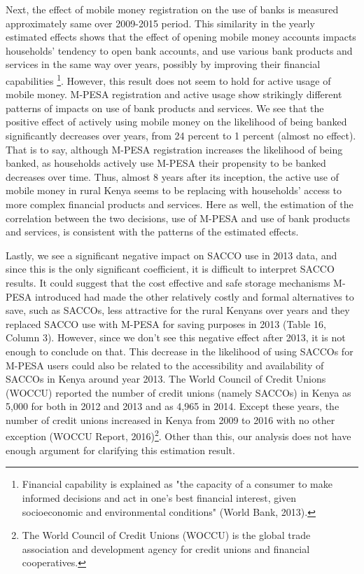 \documentclass[11pt]{article}
\numberwithin{equation}{section}
\begin{document}
Next, the effect of mobile money registration on the use of banks is measured approximately same over 2009-2015 period. This similarity in the yearly estimated effects shows that the effect of opening mobile money accounts impacts households' tendency to open bank accounts, and use various bank products and services in the same way over years, possibly by improving their financial capabilities \footnote{Financial capability is explained as "the capacity of a consumer to make informed decisions and act in one's best financial interest, given socioeconomic and environmental conditions" (World Bank, 2013).}. However, this result does not seem to hold for active usage of mobile money. M-PESA registration and active usage show strikingly different patterns of impacts on use of bank products and services. We see that the positive effect of actively using mobile money on the likelihood of being banked significantly decreases over years, from 24 percent to 1 percent (almost no effect). That is to say, although M-PESA registration increases the likelihood of being banked, as households actively use M-PESA their propensity to be banked decreases over time. Thus, almost 8 years after its inception, the active use of mobile money in rural Kenya seems to be replacing with households' access to more complex financial products and services. Here as well, the estimation of the correlation between the two decisions, use of M-PESA and use of bank products and services, is consistent with the patterns of the estimated effects.

Lastly, we see a significant negative impact on SACCO use in 2013 data, and since this is the only significant coefficient, it is difficult to interpret SACCO results. It  could suggest that the cost effective and safe storage mechanisms M-PESA introduced had made the other relatively costly and formal alternatives to save, such as SACCOs, less attractive for the rural Kenyans over years and they replaced SACCO use with M-PESA for saving purposes in 2013 (Table 16, Column 3). However, since we don't see this negative effect after 2013, it is not enough to conclude on that. This decrease in the likelihood of using SACCOs for M-PESA users could also be related to the accessibility and availability of SACCOs in Kenya around year 2013. The World Council of Credit Unions (WOCCU) reported the number of credit unions (namely SACCOs) in Kenya as 5,000 for both in 2012 and 2013 and as 4,965 in 2014. Except these years, the number of credit unions increased in Kenya from 2009 to 2016 with no other exception (WOCCU Report, 2016)\footnote{The World Council of Credit Unions (WOCCU) is the global trade association and development agency for credit unions and financial cooperatives.}. Other than this, our analysis does not have enough argument for clarifying this estimation result.
\end{document}
